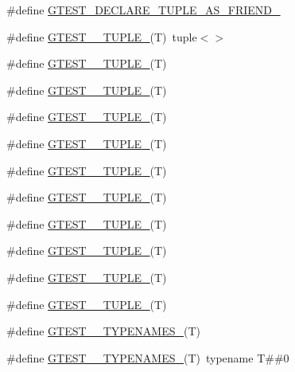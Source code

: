 \begin{DoxyCompactItemize}
\item 
\#define \hyperlink{fused-src_2gtest_2gtest_8h_a2b20671273f514a88a6e9b8328e5f257}{G\-T\-E\-S\-T\-\_\-\-D\-E\-C\-L\-A\-R\-E\-\_\-\-T\-U\-P\-L\-E\-\_\-\-A\-S\-\_\-\-F\-R\-I\-E\-N\-D\-\_\-}
\item 
\#define \hyperlink{fused-src_2gtest_2gtest_8h_acecddf48fa29ec4b0199d5a467e89778}{G\-T\-E\-S\-T\-\_\-\_\-\-T\-U\-P\-L\-E\-\_\-}(T)~tuple$<$$>$
\item 
\#define \hyperlink{fused-src_2gtest_2gtest_8h_a544374090885c4127adc2c618570323c}{G\-T\-E\-S\-T\-\_\-\_\-\-T\-U\-P\-L\-E\-\_\-}(T)
\item 
\#define \hyperlink{fused-src_2gtest_2gtest_8h_a93229c3f009273c73eca237b4d19f326}{G\-T\-E\-S\-T\-\_\-\_\-\-T\-U\-P\-L\-E\-\_\-}(T)
\item 
\#define \hyperlink{fused-src_2gtest_2gtest_8h_af2c3eab3f1a5197b408fce44eb3ed9da}{G\-T\-E\-S\-T\-\_\-\_\-\-T\-U\-P\-L\-E\-\_\-}(T)
\item 
\#define \hyperlink{fused-src_2gtest_2gtest_8h_a3625feb24d5e6eb9926fd558e4a2e3ff}{G\-T\-E\-S\-T\-\_\-\_\-\-T\-U\-P\-L\-E\-\_\-}(T)
\item 
\#define \hyperlink{fused-src_2gtest_2gtest_8h_a64e6f4a4cf55f62cde94066c6d5d5c74}{G\-T\-E\-S\-T\-\_\-\_\-\-T\-U\-P\-L\-E\-\_\-}(T)
\item 
\#define \hyperlink{fused-src_2gtest_2gtest_8h_a53f36c86a979ed8285bf3c6f82f16483}{G\-T\-E\-S\-T\-\_\-\_\-\-T\-U\-P\-L\-E\-\_\-}(T)
\item 
\#define \hyperlink{fused-src_2gtest_2gtest_8h_a8987baf82ee028d1d778447413a02c0c}{G\-T\-E\-S\-T\-\_\-\_\-\-T\-U\-P\-L\-E\-\_\-}(T)
\item 
\#define \hyperlink{fused-src_2gtest_2gtest_8h_a2bc36d1a71a551e6cda2ac5504fb7ce3}{G\-T\-E\-S\-T\-\_\-\_\-\-T\-U\-P\-L\-E\-\_\-}(T)
\item 
\#define \hyperlink{fused-src_2gtest_2gtest_8h_a1a81c17bfe3cdceb4d56b15985a44a7e}{G\-T\-E\-S\-T\-\_\-\_\-\-T\-U\-P\-L\-E\-\_\-}(T)
\item 
\#define \hyperlink{fused-src_2gtest_2gtest_8h_a275e7bcd84299cc44b9c1dba971951c4}{G\-T\-E\-S\-T\-\_\-\_\-\-T\-U\-P\-L\-E\-\_\-}(T)
\item 
\#define \hyperlink{fused-src_2gtest_2gtest_8h_ac6784ade57659fbc58baa03c265ca0ac}{G\-T\-E\-S\-T\-\_\-\_\-\-T\-Y\-P\-E\-N\-A\-M\-E\-S\-\_\-}(T)
\item 
\#define \hyperlink{fused-src_2gtest_2gtest_8h_a2042d8e9fefb83752b1028d640adfaf2}{G\-T\-E\-S\-T\-\_\-\_\-\-T\-Y\-P\-E\-N\-A\-M\-E\-S\-\_\-}(T)~typename T\#\#0
$$
\end{DoxyCompactItemize}
